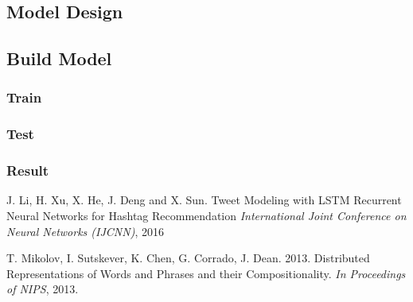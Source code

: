 \documentclass[journal, a4paper]{IEEEtran}
\begin{document}
\subsection{Model Design}
\subsection{Build Model}
\subsubsection{Train}
\subsubsection{Test}
\subsubsection{Result}



\begin{thebibliography}{5}

	J. Li, H. Xu, X. He, J. Deng and X. Sun. Tweet Modeling with LSTM Recurrent Neural
	Networks for Hashtag Recommendation {\em International Joint Conference on Neural Networks (IJCNN)}, 2016

	T. Mikolov, I. Sutskever, K. Chen, G. Corrado, J. Dean. 2013. Distributed Representations of Words and Phrases and their Compositionality. {\em In Proceedings of NIPS}, 2013.

\end{thebibliography}

\end{document}
